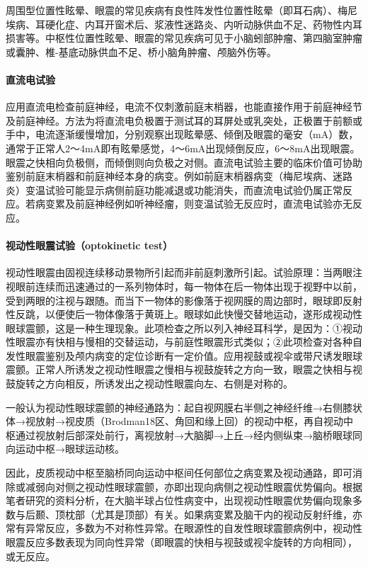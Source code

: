 周围型位置性眩晕、眼震的常见疾病有良性阵发性位置性眩晕（即耳石病）、梅尼埃病、耳硬化症、内耳开窗术后、浆液性迷路炎、内听动脉供血不足、药物性内耳损害等。中枢性位置性眩晕、眼震的常见疾病可见于小脑蚓部肿瘤、第四脑室肿瘤或囊肿、椎-基底动脉供血不足、桥小脑角肿瘤、颅脑外伤等。

\paragraph{直流电试验}

应用直流电检查前庭神经，电流不仅刺激前庭末梢器，也能直接作用于前庭神经节及前庭神经。方法为将直流电负极置于测试耳的耳屏处或乳突处，正极置于前额或手中，电流逐渐缓慢增加，分别观察出现眩晕感、倾倒及眼震的毫安（mA）数，通常于正常人2～4mA即有眩晕感觉，4～6mA出现倾倒反应，6～8mA出现眼震。眼震之快相向负极侧，而倾倒则向负极之对侧。直流电试验主要的临床价值可协助鉴别前庭末梢器和前庭神经本身的病变。例如前庭末梢器病变（梅尼埃病、迷路炎）变温试验可能显示病侧前庭功能减退或功能消失，而直流电试验仍属正常反应。若病变累及前庭神经例如听神经瘤，则变温试验无反应时，直流电试验亦无反应。

\paragraph{视动性眼震试验（optokinetic test）}

视动性眼震由固视连续移动景物所引起而非前庭刺激所引起。试验原理：当两眼注视眼前连续而迅速通过的一系列物体时，每一物体在后一物体出现于视野中以前，受到两眼的注视与跟随。而当下一物体的影像落于视网膜的周边部时，眼球即反射性反跳，以便使后一物体像落于黄斑上。眼球如此快慢交替地运动，遂形成视动性眼球震颤，这是一种生理现象。此项检查之所以列入神经耳科学，是因为：①视动性眼震亦有快相与慢相的交替运动，与前庭性眼震形式类似；②此项检查对各种自发性眼震鉴别及颅内病变的定位诊断有一定价值。应用视鼓或视伞或带尺诱发眼球震颤。正常人所诱发之视动性眼震之慢相与视鼓旋转之方向一致，眼震之快相与视鼓旋转之方向相反，所诱发出之视动性眼震向左、右侧是对称的。

一般认为视动性眼球震颤的神经通路为：起自视网膜右半侧之神经纤维→右侧膝状体→视放射→视皮质（Brodman18区、角回和缘上回）的视动中枢，再自视动中枢通过视放射后部深处前行，离视放射→大脑脚→上丘→经内侧纵束→脑桥眼球同向运动中枢→眼球运动核。

因此，皮质视动中枢至脑桥同向运动中枢间任何部位之病变累及视动通路，即可消除或减弱向对侧之视动性眼球震颤，亦即出现向病侧之视动性眼震优势偏向。根据笔者研究的资料分析，在大脑半球占位性病变中，出现视动性眼震优势偏向现象多数与后颞、顶枕部（尤其是顶部）有关。如果病变累及脑干内的视动反射纤维，亦常有异常反应，多数为不对称性异常。在眼源性的自发性眼球震颤病例中，视动性眼震反应多数表现为同向性异常（即眼震的快相与视鼓或视伞旋转的方向相同），或无反应。

